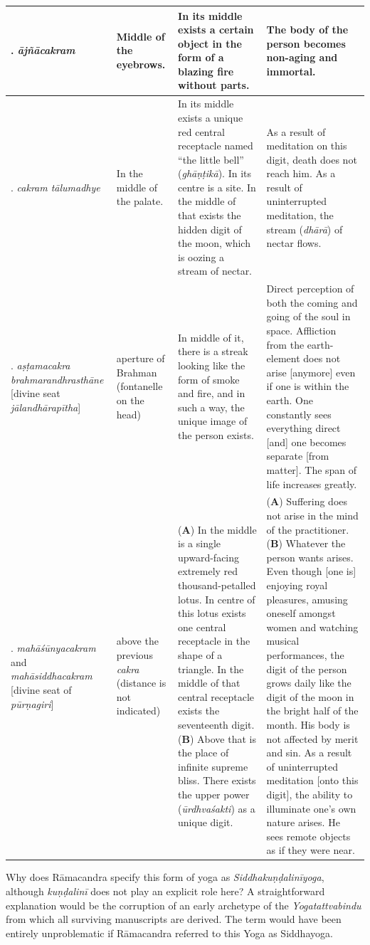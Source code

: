 \begin{longtable}{|>{\raggedright\arraybackslash}p{2cm}|>{\raggedright\arraybackslash}p{1.75cm}|>{\raggedright\arraybackslash}p{3.25cm}|>{\raggedright\arraybackslash}p{3.5cm}|}
\hline
6. \textit{ājñācakram} & Middle of the eyebrows. & In its middle exists a certain object in the form of a blazing fire without parts. & The body of the person becomes non-aging and immortal. \\
\hline
7. \textit{cakram tālumadhye} & In the middle of the palate. & In its middle exists a unique red central receptacle named ``the little bell'' (\textit{ghāṇṭikā}). In its centre is a site. In the middle of that exists the hidden digit of the moon, which is oozing a stream of nectar. & As a result of meditation on this digit, death does not reach him. As a result of uninterrupted meditation, the stream (\textit{dhārā}) of nectar flows. \\
\hline
8. \textit{aṣṭamacakra brahmarandhrasthāne} [divine seat \textit{jālandhārapītha}] & aperture of Brahman (fontanelle on the head) & In middle of it, there is a streak looking like the form of smoke and fire, and in such a way, the unique image of the person exists. & Direct perception of both the coming and going of the soul in space. Affliction from the earth-element does not arise [anymore] even if one is within the earth. One constantly sees everything direct [and] one becomes separate [from matter]. The span of life increases greatly. \\
\hline
9. \textit{mahāśūnyacakram} and \textit{mahāsiddhacakram} [divine seat of \textit{pūrṇagiri}] & above the previous \textit{cakra} (distance is not indicated) & (\textbf{A}) In the middle is a single upward-facing extremely red thousand-petalled lotus. In centre of this lotus exists one central receptacle in the shape of a triangle. In the middle of that central receptacle exists the seventeenth digit. (\textbf{B}) Above that is the place of infinite supreme bliss. There exists the upper power (\textit{ūrdhvaśakti}) as a unique digit. & (\textbf{A}) Suffering does not arise in the mind of the practitioner. (\textbf{B}) Whatever the person wants arises. Even though [one is] enjoying royal pleasures, amusing oneself amongst women and watching musical performances, the digit of the person grows daily like the digit of the moon in the bright half of the month. His body is not affected by merit and sin. As a result of uninterrupted meditation [onto this digit], the ability to illuminate one's own nature arises. He sees remote objects as if they were near. \\
\end{longtable}
\normalsize

Why does Rāmacandra specify this form of yoga as \emph{Siddhakuṇḍalinīyoga}, although \textit{kuṇḍalinī} does not play an explicit role here? A straightforward explanation would be the corruption of an early archetype of the \textit{Yogatattvabindu} from which all surviving manuscripts are derived. The term would have been entirely unproblematic if Rāmacandra referred to this Yoga as Siddhayoga.

